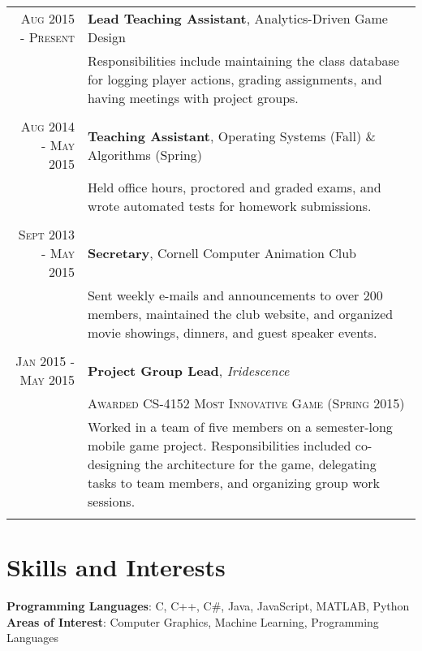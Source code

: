 \documentclass[a4paper,10pt]{article} %
\begin{document}
\begin{tabular}{rp{11.8cm}}

\textsc{Aug 2015 - Present} & \textbf{Lead Teaching Assistant}, Analytics-Driven Game Design \\
& \small{Responsibilities include maintaining the class database for logging player actions, grading assignments, and having meetings with project groups.}\\
\multicolumn{2}{c}{} \\


\textsc{Aug 2014 - May 2015} & \textbf{Teaching Assistant}, Operating Systems (Fall) \& Algorithms (Spring) \\
& \small{Held office hours, proctored and graded exams, and wrote automated tests for homework submissions.}\\
\multicolumn{2}{c}{} \\


\textsc{Sept 2013 - May 2015} & \textbf{Secretary}, Cornell Computer Animation Club\\
& \small{Sent weekly e-mails and announcements to over 200 members, maintained the club website, and organized movie showings, dinners, and guest speaker events.}\\
\multicolumn{2}{c}{} \\


\textsc{Jan 2015 - May 2015} & \textbf{Project Group Lead}, \textit{Iridescence}\\
& \textsc{Awarded CS-4152 Most Innovative Game (Spring 2015)}\\
& \small{Worked in a team of five members on a semester-long mobile game project. Responsibilities included co-designing the architecture for the game, delegating tasks to team members, and organizing group work sessions.}\\
\multicolumn{2}{c}{} \\

\end{tabular}


\section{Skills and Interests}

\textbf{Programming Languages}: C, C++, C\#, Java, JavaScript, MATLAB, Python\\
\textbf{Areas of Interest}: Computer Graphics, Machine Learning, Programming Languages

\end{document}
